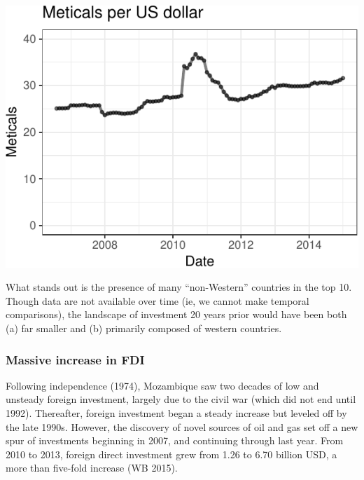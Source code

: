 \documentclass[]{elsarticle} %
\begin{document}
\begin{center}\includegraphics{paper_files/figure-latex/unnamed-chunk-6-1} \end{center}

What stands out is the presence of many ``non-Western'' countries in the
top 10. Though data are not available over time (ie, we cannot make
temporal comparisons), the landscape of investment 20 years prior would
have been both (a) far smaller and (b) primarily composed of western
countries.

\subsubsection{Massive increase in FDI}\label{massive-increase-in-fdi}

Following independence (1974), Mozambique saw two decades of low and
unsteady foreign investment, largely due to the civil war (which did not
end until 1992). Thereafter, foreign investment began a steady increase
but leveled off by the late 1990s. However, the discovery of novel
sources of oil and gas set off a new spur of investments beginning in
2007, and continuing through last year. From 2010 to 2013, foreign
direct investment grew from 1.26 to 6.70 billion USD, a more than
five-fold increase (WB 2015).
\end{document}
